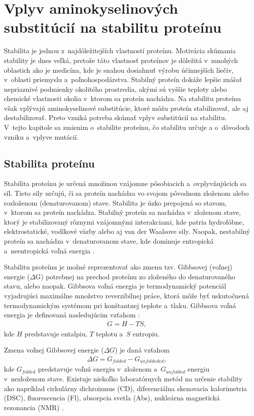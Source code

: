 \chapter{Vplyv aminokyselinových substitúcií na stabilitu proteínu}

Stabilita je jednou z~najdôležitejších vlastností proteínu. Motivácia skúmania stability je dnes veľká, pretože táto vlastnosť proteínov je dôležitá v~mnohých oblastich ako je medicína, kde je snahou dosiahnuť výrobu účinnejších liečiv, v~oblasti priemyslu a~poľnohospodárstva. Stabilný proteín dokáže lepšie znášať nepriaznivé podmienky okolitého prostredia, akými sú vyššie teploty alebo chemické vlastnosti okolia v~ktorom sa proteín nachádza. Na stabilitu proteínu však vplývajú aminokyselinové substitúcie, ktoré môžu proteín stabilizovať, ale aj destabilizovať. Preto vzniká potreba skúmať vplyv substitúcií na stabilitu. V~tejto kapitole sa zmienim o~stabilite proteínu, čo stabilitu určuje a o~dôvodoch vzniku a~vplyve mutácií.


\section{Stabilita proteínu}
Stabilita proteínu je určená množinou vzájomne pôsobiacich a~ovplyvňujúcich sa síl. Tieto sily určujú, či sa proteín nachádza vo svojom pôvodnom zloženom alebo rozloženom (denaturovanom) stave. Stabilita je úzko prepojená so stavom, v~ktorom sa proteín nachádza. Stabilný proteín sa nachádza v~zloženom stave, ktorý je stabilizovaný rôznymi vzájomnými interakciami, kde patria hydrofóbne, elektrostatické, vodíkové väzby alebo aj van der Waalsove sily. Naopak, nestabilný proteín sa nachádza v~denaturovanom stave, kde dominuje entropická a~neentropická voľná energia \cite{gromiha}.

Stabilitu proteínu je možné reprezentovať ako zmenu tzv. Gibbsovej (voľnej) energie ($\Delta$G) potrebnej na prechod proteínu zo zloženého do denaturovaného stavu, alebo naopak. 
Gibbsova voľná energia je termodynamický potenciál vyjadrujúci maximálne množstvo reverzibilnej práce, ktorá môže byť uskutočnená termodynamickým systémom pri konštantnej teplote a~tlaku. Gibbsova voľná energia je definovaná nasledujúcim vzťahom \cite{gibbs}:
\begin{align}
	G = H - TS,
\end{align}
kde $H$ predstavuje entalpiu, $T$ teplotu a~$S$ entropiu.

Zmena voľnej Gibbsovej energie ($\Delta G$) je daná vzťahom
\begin{align}
	\Delta G = G_{folded} - G_{unfoldeded},
\end{align}
kde $G_{folded}$ predstavuje voľnú energiu v~zloženom a~$G_{unfolded}$ energiu v~nezloženom stave.
Existuje niekoľko laboratórnych metód na určenie stability ako napríklad cirkulárny dichroizmus (CD), diferenciálna skenovacia kalorimetria (DSC), fluorescencia (Fl), absorpcia svetla (Abs), nukleárna magnetická rezonancia (NMR) \cite{gromiha}.

